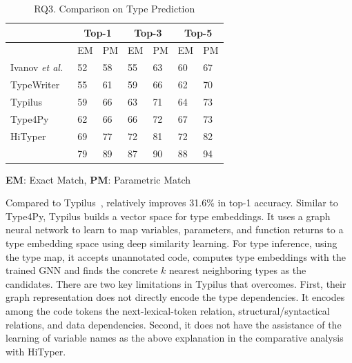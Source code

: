 \begin{table}[t]%
  \caption{RQ3. Comparison on Type Prediction}
  \vspace{-7pt}
	\begin{center}
		\small
		\renewcommand{\arraystretch}{1} \begin{tabular}{|p{1.9cm}<{\centering}|p{0.65cm}<{\centering}|p{0.65cm}<{\centering}|p{0.65cm}<{\centering}|p{0.65cm}<{\centering}|p{0.65cm}<{\centering}|p{0.65cm}<{\centering}|}
			
			\hline
                       & \multicolumn{2}{c|}{Top-1}         & \multicolumn{2}{c|}{Top-3}         & \multicolumn{2}{c|}{Top-5} \\
			\hline
                       & EM & PM & EM & PM & EM & PM  \\ 
			\hline
		        Ivanov {\em et al.}~\cite{ivanov21predicting} &  52    & 58     &   55   &  63     &  60     &   67    \\
			TypeWriter~\cite{typewriter-fse20}  &   55   &  61    &  59    &   66   &  62    &  70     \\
			Typilus~\cite{typilus-pldi20}  &   59   &  66    &  63    &  71    &  64    & 73      \\
                       	Type4Py~\cite{Type4Py-icse22}  & 62 & 66 & 66 & 72 & 67 & 73 \\
                        HiTyper~\cite{HiTyper-icse22}  & 69 & 77 & 72 & 81 & 72 & 82 \\
			\hline
			{\bf {\tool}}                        & 79 & 89 & 87 & 90 & 88 & 94 \\
			\hline
		\end{tabular}
		\label{type-result}
		{\bf EM}: Exact Match, {\bf PM}: Parametric Match
	\end{center}
\end{table}

Compared to Typilus~\cite{typilus-pldi20}, {\tool} relatively improves
31.6\% in top-1 accuracy. Similar to Type4Py, Typilus builds a vector
space for type embeddings. It uses a graph neural network to learn to
map variables, parameters, and function returns to a type embedding
space using deep similarity learning. For type inference, using the
type map, it accepts unannotated code, computes type embeddings with
the trained GNN and finds the concrete $k$ nearest neighboring types
as the candidates. There are two key limitations in Typilus that
{\tool} overcomes. First, their graph representation does not directly
encode the type dependencies. It encodes among the code tokens the
next-lexical-token relation, structural/syntactical relations, and
data dependencies. Second, it does not have the assistance of the
learning of variable names as the above explanation in the comparative
analysis with HiTyper.

